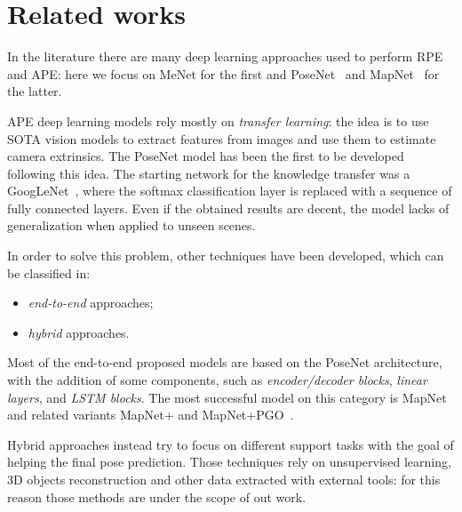 \section{Related works}
In the literature there are many deep learning approaches used to perform RPE and APE: here we focus on MeNet for the first and PoseNet~\cite{9348762} and MapNet~\cite{DBLP:journals/corr/abs-1712-03342} for the latter.

APE deep learning models rely mostly on \emph{transfer learning}: the idea is to use SOTA vision models to extract features from images and use them to estimate camera extrinsics.
The PoseNet model has been the first to be developed following this idea. The starting network for the knowledge transfer was a GoogLeNet~\cite{googlenet}, where the softmax classification layer is replaced with a sequence of fully connected layers. Even if the obtained results are decent, the model lacks of generalization when applied to unseen scenes.

In order to solve this problem, other techniques have been developed, which can be classified in:
\begin{itemize}
    \item \emph{end-to-end} approaches;
    \item \emph{hybrid} approaches.
\end{itemize}

Most of the end-to-end proposed models are based on the PoseNet architecture, with the addition of some components, such as \emph{encoder/decoder blocks}, \emph{linear layers}, and \emph{LSTM blocks}. The most successful model on this category is MapNet and related variants MapNet+ and MapNet+PGO~\cite{DBLP:journals/corr/abs-1712-03342}.

Hybrid approaches instead try to focus on different support tasks with the goal of helping the final pose prediction. Those techniques rely on unsupervised learning, 3D objects reconstruction and other data extracted with external tools: for this reason those methods are under the scope of out work.
